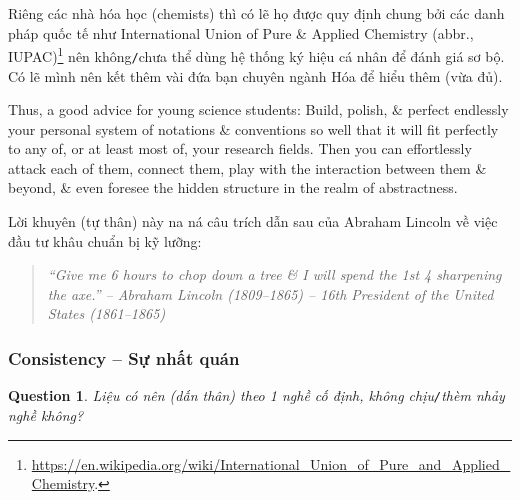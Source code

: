 \documentclass[12pt]{article}
\newtheorem{question}{Question}
\begin{document}
Riêng các nhà hóa học (chemists) thì có lẽ họ được quy định chung bởi các danh pháp quốc tế như International Union of Pure \& Applied Chemistry (abbr., IUPAC)\footnote{\url{https://en.wikipedia.org/wiki/International_Union_of_Pure_and_Applied_Chemistry}.} nên không{\tt/}chưa thể dùng hệ thống ký hiệu cá nhân để đánh giá sơ bộ. Có lẽ mình nên kết thêm vài đứa bạn chuyên ngành Hóa để hiểu thêm (vừa đủ).

Thus, a good advice for young science students: Build, polish, \& perfect endlessly your personal system of notations \& conventions so well that it will fit perfectly to any of, or at least most of, your research fields. Then you can effortlessly attack each of them, connect them, play with the interaction between them \& beyond, \& even foresee the hidden structure in the realm of abstractness.

Lời khuyên (tự thân) này na ná câu trích dẫn sau của Abraham Lincoln về việc đầu tư khâu chuẩn bị kỹ lưỡng:
\begin{quote}\it
	``Give me 6 hours to chop down a tree \& I will spend the 1st 4 sharpening the axe.'' -- {\sc Abraham Lincoln} (1809--1865) -- 16th President of the United States (1861--1865)
\end{quote}

\subsubsection{Consistency -- Sự nhất quán}

\begin{question}
	Liệu có nên (dấn thân) theo 1 nghề cố định, không chịu{\tt/}thèm nhảy nghề không? 
\end{question}
\end{document}
